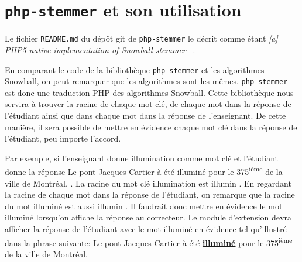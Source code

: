 \section{\texttt{php-stemmer} et son utilisation}
\label{chap:phpstemmer}
Le fichier \texttt{README.md} du d\'ep\^ot git de \texttt{php-stemmer} le d\'ecrit comme \'etant \og \textit{[a] PHP5 native implementation of Snowball stemmer} \fg{}~\cite{phpstemmer}.

En comparant le code de la biblioth\`eque \texttt{php-stemmer} et les algorithmes Snowball, on peut remarquer que les algorithmes sont les m\^emes.
\texttt{php-stemmer} est donc une traduction PHP des algorithmes Snowball.
Cette biblioth\`eque nous servira \`a trouver la racine de chaque mot cl\'e, de chaque mot dans la r\'eponse de l'\'etudiant ainsi que dans chaque mot dans la r\'eponse de l'enseignant.
De cette mani\`ere, il sera possible de mettre en \'evidence chaque mot cl\'e dans la r\'eponse de l'\'etudiant, peu importe l'accord.

Par exemple, si l'enseignant donne \og illumination \fg{} comme mot cl\'e et l'\'etudiant donne la r\'eponse \og Le pont Jacques-Cartier \`a \'et\'e illumin\'e pour le 375\textsuperscript{i\`eme} de la ville de Montr\'eal. \fg{}.
La racine du mot cl\'e \og illumination \fg{}  est \og illumin \fg{}.
En regardant la racine de chaque mot dans la r\'eponse de l'\'etudiant, on remarque que la racine du mot \og illumin\'e \fg{} est aussi \og illumin \fg{}.
Il faudrait donc mettre en \'evidence le mot \og illumin\'e \fg{} lorsqu'on affiche la r\'eponse au correcteur.
Le module d'extension devra afficher la r\'eponse de l'\'etudiant avec le mot illumin\'e en \'evidence tel qu'illustr\'e dans la phrase suivante: \og Le pont Jacques-Cartier \`a \'et\'e \textbf{\underline{illumin\'e}} pour le 375\textsuperscript{i\`eme} de la ville de Montr\'eal. \fg{} 
